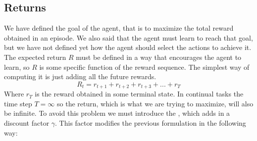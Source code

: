 \subsection{Returns\label{subsec:returns}}

We have defined the goal of the agent, that is to maximize the total reward obtained in an episode. We also said that the agent must learn to reach that goal, but we have not defined yet how the agent should select the actions to achieve it. The expected return $R$ must be defined in a way that encourages the agent to learn, so $R$ is some specific function of the reward sequence. The simplest way of computing it is just adding all the future rewards.
\begin{equation}
    R_t=r_{t+1}+r_{t+2}+r_{t+3}+...+r_T
\end{equation}
Where $r_T$ is the reward obtained in some terminal state. In continual tasks the
time step $T = \infty$ so the return, which is what we are trying to maximize, will also be infinite. To avoid this problem we must introduce
the , which adds in a discount factor $\gamma$. This factor modifies the previous formulation in the following way:
